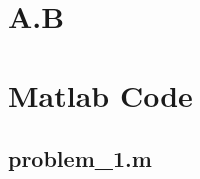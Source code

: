 \documentclass{article}
\begin{document}
\section*{A.B}

\section*{Matlab Code}
\subsection*{problem\_1.m}
\begin{lstlisting}[language=Matlab]
\end{lstlisting}
\end{document}
